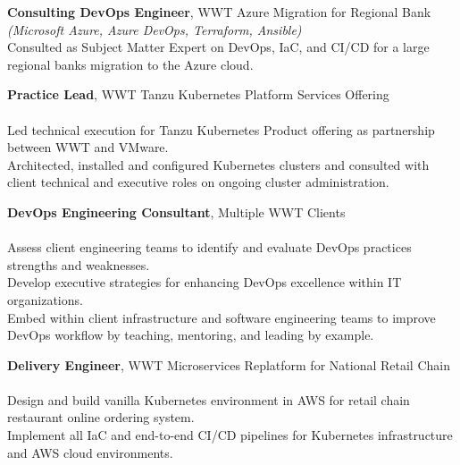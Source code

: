 \documentclass[letterpaper]{article}
\begin{document}
{\textbf{Consulting DevOps Engineer}, WWT Azure Migration for Regional Bank } \\
{\sl (Microsoft Azure, Azure DevOps, Terraform, Ansible)} \\
Consulted as Subject Matter Expert on DevOps, IaC, and CI/CD for a large regional
  bank\textquotesingle{}s migration to the Azure cloud.\\
\vspace*{2mm}

{\textbf{Practice Lead}, WWT Tanzu Kubernetes Platform Services Offering} \\
\hspace{5mm}{\sl (VMware Tanzu Kubernetes Grid (TKG), Kubernetes, Terraform, Ansible, Helm,
  VMware ESX, Amazon AWS)} \\
Led technical execution for Tanzu Kubernetes Product offering as partnership
  between WWT and VMware. \\
Architected, installed and configured Kubernetes clusters and consulted with
  client technical and executive roles on ongoing cluster administration.\\
\vspace*{2mm}

{\textbf{DevOps Engineering Consultant}, Multiple WWT Clients} \\
\hspace{5mm}{\sl (The Three Ways, Theory of Constraints, The Five Pillars, Kaizen, Lean, Kanban, Scrum)} \\
Assess client engineering teams to identify and evaluate DevOps practices
  strengths and weaknesses.\\
Develop executive strategies for enhancing DevOps excellence within IT
  organizations.\\
Embed within client infrastructure and software engineering teams to improve
  DevOps workflow by teaching, mentoring, and leading by example.\\
\vspace*{2mm}

{\textbf{Delivery Engineer}, WWT Microservices Replatform for National Retail Chain} \\
\hspace{5mm}{\sl (Kubernetes, KOPS, Helm, Amazon AWS, Ansible, Terraform, GitLab CI, Packer, Docker, Jenkins, PostgreSQL)} \\
Design and build vanilla Kubernetes environment in AWS for retail chain
  restaurant online ordering system.\\
Implement all IaC and end-to-end CI/CD pipelines for Kubernetes infrastructure
  and AWS cloud environments.\\
\vspace*{2mm}
\end{document}

